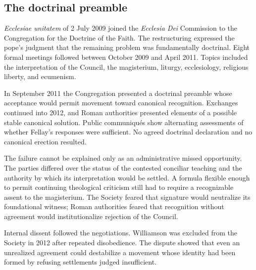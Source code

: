 
\subsection{The doctrinal preamble}

\emph{Ecclesiae unitatem} of 2 July 2009 joined the \emph{Ecclesia Dei} Commission to the Congregation for the Doctrine of the Faith. The restructuring expressed the pope's judgment that the remaining problem was fundamentally doctrinal. Eight formal meetings followed between October 2009 and April 2011. Topics included the interpretation of the Council, the magisterium, liturgy, ecclesiology, religious liberty, and ecumenism.

In September 2011 the Congregation presented a doctrinal preamble whose acceptance would permit movement toward canonical recognition. Exchanges continued into 2012, and Roman authorities presented elements of a possible stable canonical solution. Public communiqués show alternating assessments of whether Fellay's responses were sufficient. No agreed doctrinal declaration and no canonical erection resulted.

The failure cannot be explained only as an administrative missed opportunity. The parties differed over the status of the contested conciliar teaching and the authority by which its interpretation would be settled. A formula flexible enough to permit continuing theological criticism still had to require a recognizable assent to the magisterium. The Society feared that signature would neutralize its foundational witness; Roman authorities feared that recognition without agreement would institutionalize rejection of the Council.

Internal dissent followed the negotiations. Williamson was excluded from the Society in 2012 after repeated disobedience. The dispute showed that even an unrealized agreement could destabilize a movement whose identity had been formed by refusing settlements judged insufficient.
